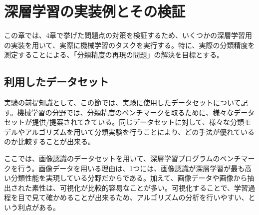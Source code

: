 \chapter{深層学習の実装例とその検証}
この章では、4章で挙げた問題点の対策を検証するため、いくつかの深層学習用の実装を用いて、実際に機械学習のタスクを実行する。特に、実際の分類精度を測定することによる、「分類精度の再現の問題」の解決を目標とする。
\section{利用したデータセット}
実験の前提知識として、この節では、実験に使用したデータセットについて記す。機械学習の分野では、分類精度のベンチマークを取るために、様々なデータセットが提供/提案されてきている。同じデータセットに対して、様々な分類モデルやアルゴリズムを用いて分類実験を行うことにより、どの手法が優れているのか比較することが出来る。\par
ここでは、画像認識のデータセットを用いて、深層学習プログラムのベンチマークを行う。画像データを用いる理由は、1つには、画像認識が深層学習が最も高い分類性能を実現している分野だからである。加えて、画像データや画像から抽出された素性は、可視化が比較的容易なことが多い。可視化することで、学習過程を目で見て確かめることが出来るため、アルゴリズムの分析を行いやすい、という利点がある。
